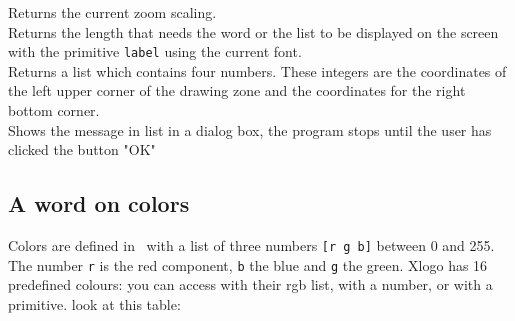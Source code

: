 Returns the current zoom scaling.\\
Returns the length that needs the word or the list to be displayed on the screen with the primitive \texttt{label} using the current font. \\
Returns a list which contains four numbers. These integers are the coordinates of the left upper corner of the drawing zone and the coordinates for the right bottom corner.\\
 Shows the message in list in a dialog box, the program stops until the user has clicked the button "OK"\\
\subsection{A word on colors}
Colors are defined in \xlogo\ with a list of three numbers \texttt{[r g b]} between 0 and 255. The number \texttt{r} is the red component, \texttt{b} the blue and \texttt{g} the green. Xlogo has 16 predefined colours: you can access with their rgb list, with a number, or with a primitive. look at  this table: \label{couleurs}
